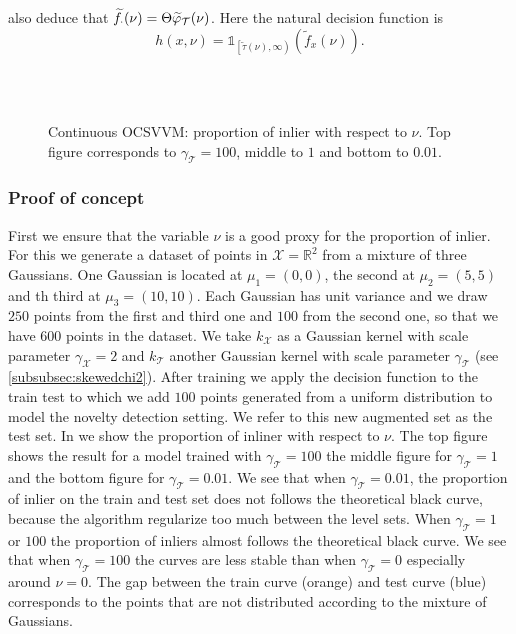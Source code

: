 also deduce that $\widetilde{f}_{\cdot}(\nu) = \Theta
\widetilde{\varphi}_{\mathcal{T}}(\nu)$. Here the natural decision function is
\begin{dmath}
    \label{eq:continuous_decision}
    h(x, \nu) = \mathds{1}_{\left[\widetilde{\tau}(\nu),\infty\right)}
    \left(\widetilde{f}_x(\nu)\right).
\end{dmath}
\begin{figure}
    {\centering
    \resizebox{2\textwidth}{!}{} \\
    \resizebox{2\textwidth}{!}{} \\
    \resizebox{2\textwidth}{!}{}}
    \caption[Continuous OCSVM: proportion of inlier with respect to
    nu]{Continuous OCSVVM: proportion of inlier with respect to $\nu$.
    Top figure corresponds to $\gamma_{\mathcal{T}} = 100$, middle to $1$ and
    bottom to $0.01$. \label{fig:inlier_proportion}}
\end{figure}

\subsubsection{Proof of concept}
First we ensure that the variable $\nu$ is a good proxy for the proportion of
inlier. For this we generate a dataset of points in $\mathcal{X}=\mathbb{R}^2$
from a mixture of three Gaussians. One Gaussian is located at $\mu_1=(0, 0)$,
the second at $\mu_2=(5, 5)$ and th third at $\mu_3 = (10, 10)$. Each Gaussian
has unit variance and we draw $250$ points from the first and third one and
$100$ from the second one, so that we have $600$ points in the dataset.  We
take $k_{\mathcal{X}}$ as a Gaussian kernel with scale parameter
$\gamma_{\mathcal{X}}=2$ and $k_{\mathcal{T}}$ another Gaussian kernel with
scale parameter $\gamma_{\mathcal{T}}$ (see \cref{subsubsec:skewedchi2}). After
training we apply the decision function to the train test to which we add $100$
points generated from a uniform distribution to model the novelty detection
setting. We refer to this new augmented set as the test set.
In  we show the proportion of inliner with respect
to $\nu$. The top figure shows the result for a model trained with
$\gamma_{\mathcal{T}}=100$ the middle figure for $\gamma_{\mathcal{T}}=1$ and
the bottom figure for $\gamma_{\mathcal{T}}=0.01$. We see that when
$\gamma_{\mathcal{T}}=0.01$, the proportion of inlier on the train and test set
does not follows the theoretical black curve, because the algorithm regularize
too much between the level sets. When $\gamma_{\mathcal{T}}=1$ or $100$ the
proportion of inliers almost follows the theoretical black curve. We see that
when $\gamma_{\mathcal{T}}=100$ the curves are less stable than when
$\gamma_{\mathcal{T}}=0$ especially around $\nu=0$. The gap between the train
curve (orange) and test curve (blue) corresponds to the  points that
are not distributed according to the mixture of Gaussians.

